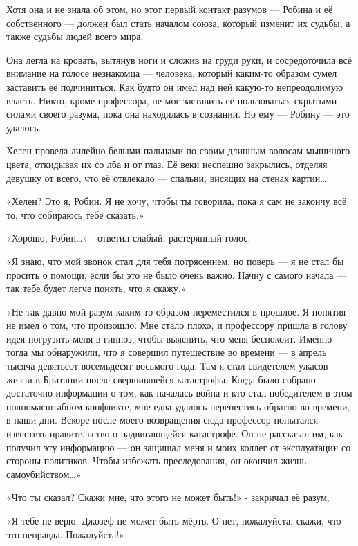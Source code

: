 \documentclass[a4paper,12pt]{book}
\begin{document}
\par
Хотя она и не знала об этом, но этот первый контакт разумов — Робина и её собственного — должен был стать началом союза, который изменит их судьбы, а также судьбы людей всего мира.
\par
Она легла на кровать, вытянув ноги и сложив на груди руки, и сосредоточила всё внимание на голосе незнакомца — человека, который каким-то образом сумел заставить её подчиниться. Как будто он имел над ней какую-то непреодолимую власть. Никто, кроме профессора, не мог заставить её пользоваться скрытыми силами своего разума, пока она находилась в сознании. Но ему — Робину — это удалось.
\par
Хелен провела лилейно-белыми пальцами по своим длинным волосам мышиного цвета, откидывая их со лба и от глаз. Её веки неспешно закрылись, отделяя девушку от всего, что её отвлекало — спальни, висящих на стенах картин…\\
\par
«Хелен? Это я, Робин. Я не хочу, чтобы ты говорила, пока я сам не закончу всё то, что собираюсь тебе сказать.»
\par
«Хорошо, Робин…» - ответил слабый, растерянный голос.
\par
«Я знаю, что мой звонок стал для тебя потрясением, но поверь — я не стал бы просить о помощи, если бы это не было очень важно. Начну с самого начала — так тебе будет легче понять, что я скажу.»
\par
«Не так давно мой разум каким-то образом переместился в прошлое. Я понятия не имел о том, что произошло. Мне стало плохо, и профессору пришла в голову идея погрузить меня в гипноз, чтобы выяснить, что меня беспокоит. Именно тогда мы обнаружили, что я совершил путешествие во времени — в апрель тысяча девятьсот восемьдесят восьмого года. Там я стал свидетелем ужасов жизни в Британии после свершившейся катастрофы. Когда было собрано достаточно информации о том, как началась война и кто стал победителем в этом полномасштабном конфликте, мне едва удалось перенестись обратно во времени, в наши дни. Вскоре после моего возвращения сюда профессор попытался известить правительство о надвигающейся катастрофе. Он не рассказал им, как получил эту информацию — он защищал меня и моих коллег от эксплуатации со стороны политиков. Чтобы избежать преследования, он окончил жизнь самоубийством…»
\par
«Что ты сказал? Скажи мне, что этого не может быть!» - закричал её разум,
\par
«Я тебе не верю, Джозеф не может быть мёртв. О нет, пожалуйста, скажи, что это неправда. Пожалуйста!»
\end{document}
